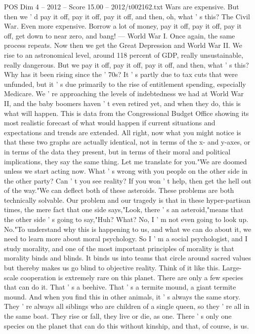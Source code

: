 \begin{textsample}{POS Dim 4 – 2012 – Score 15.00 – 2012/t002162.txt}
Wars are expensive.
But then we ' d pay it off, pay it off, pay it off, and then, oh, what ' s this?
The Civil War.
Even more expensive.
Borrow a lot of money, pay it off, pay it off, pay it off, get down to near zero, and bang! — World War I.
Once again, the same process repeats.
Now then we get the Great Depression and World War II.
We rise to an astronomical level, around 118 percent of GDP, really unsustainable, really dangerous.
But we pay it off, pay it off, pay it off, and then, what ' s this?
Why has it been rising since the ' 70s?
It ' s partly due to tax cuts that were unfunded, but it ' s due primarily to the rise of entitlement spending, especially Medicare.
We ' re approaching the levels of indebtedness we had at World War II, and the baby boomers haven ' t even retired yet, and when they do, this is what will happen.
This is data from the Congressional Budget Office showing its most realistic forecast of what would happen if current situations and expectations and trends are extended.
All right, now what you might notice is that these two graphs are actually identical, not in terms of the x- and y-axes, or in terms of the data they present, but in terms of their moral and political implications, they say the same thing.
Let me translate for you."We are doomed unless we start acting now.
What ' s wrong with you people on the other side in the other party?
Can ' t you see reality?
If you won ' t help, then get the hell out of the way."We can deflect both of these asteroids.
These problems are both technically solvable.
Our problem and our tragedy is that in these hyper-partisan times, the mere fact that one side says,"Look, there ' s an asteroid,"means that the other side ' s going to say,"Huh?
What?
No, I ' m not even going to look up.
No."To understand why this is happening to us, and what we can do about it, we need to learn more about moral psychology.
So I ' m a social psychologist, and I study morality, and one of the most important principles of morality is that morality binds and blinds.
It binds us into teams that circle around sacred values but thereby makes us go blind to objective reality.
Think of it like this.
Large-scale cooperation is extremely rare on this planet.
There are only a few species that can do it.
That ' s a beehive.
That ' s a termite mound, a giant termite mound.
And when you find this in other animals, it ' s always the same story.
They ' re always all siblings who are children of a single queen, so they ' re all in the same boat.
They rise or fall, they live or die, as one.
There ' s only one species on the planet that can do this without kinship, and that, of course, is us.

\end{textsample}
